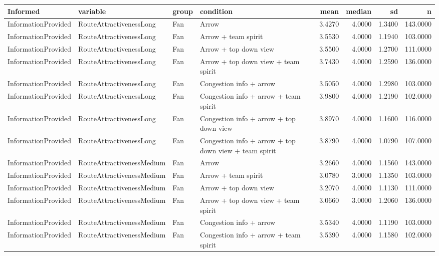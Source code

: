 \begin{tabular}{llllrrrr}
  \hline
Informed & variable & group & condition & mean & median & sd & n \\ 
  \hline
InformationProvided & RouteAttractivenessLong & Fan & Arrow & 3.4270 & 4.0000 & 1.3400 & 143.0000 \\ 
  InformationProvided & RouteAttractivenessLong & Fan & Arrow + team spirit & 3.5530 & 4.0000 & 1.1940 & 103.0000 \\ 
  InformationProvided & RouteAttractivenessLong & Fan & Arrow + top down view & 3.5500 & 4.0000 & 1.2700 & 111.0000 \\ 
  InformationProvided & RouteAttractivenessLong & Fan & Arrow + top down view + team spirit & 3.7430 & 4.0000 & 1.2590 & 136.0000 \\ 
  InformationProvided & RouteAttractivenessLong & Fan & Congestion info + arrow & 3.5050 & 4.0000 & 1.2980 & 103.0000 \\ 
  InformationProvided & RouteAttractivenessLong & Fan & Congestion info + arrow + team spirit & 3.9800 & 4.0000 & 1.2190 & 102.0000 \\ 
  InformationProvided & RouteAttractivenessLong & Fan & Congestion info + arrow + top down view & 3.8970 & 4.0000 & 1.1600 & 116.0000 \\ 
  InformationProvided & RouteAttractivenessLong & Fan & Congestion info + arrow + top down view + team spirit & 3.8790 & 4.0000 & 1.0790 & 107.0000 \\ 
  InformationProvided & RouteAttractivenessMedium & Fan & Arrow & 3.2660 & 4.0000 & 1.1560 & 143.0000 \\ 
  InformationProvided & RouteAttractivenessMedium & Fan & Arrow + team spirit & 3.0780 & 3.0000 & 1.1350 & 103.0000 \\ 
  InformationProvided & RouteAttractivenessMedium & Fan & Arrow + top down view & 3.2070 & 4.0000 & 1.1130 & 111.0000 \\ 
  InformationProvided & RouteAttractivenessMedium & Fan & Arrow + top down view + team spirit & 3.0660 & 3.0000 & 1.2060 & 136.0000 \\ 
  InformationProvided & RouteAttractivenessMedium & Fan & Congestion info + arrow & 3.5340 & 4.0000 & 1.1190 & 103.0000 \\ 
  InformationProvided & RouteAttractivenessMedium & Fan & Congestion info + arrow + team spirit & 3.5390 & 4.0000 & 1.1580 & 102.0000 \\ 

\end{tabular}
